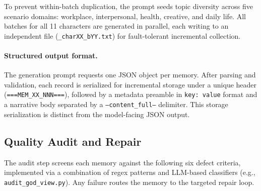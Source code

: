 \documentclass[11pt]{article}
\begin{document}
To prevent within-batch duplication, the prompt seeds topic diversity across five scenario domains: workplace, interpersonal, health, creative, and daily life. All batches for all 11 characters are generated in parallel, each writing to an independent file (\texttt{\_charXX\_bYY.txt}) for fault-tolerant incremental collection.

\paragraph{Structured output format.}
The generation prompt requests one JSON object per memory. After parsing and validation, each record is serialized for incremental storage under a unique header (\texttt{===MEM\_XX\_NNN===}), followed by a metadata preamble in \texttt{key: value} format and a narrative body separated by a \texttt{---content\_full---} delimiter. This storage serialization is distinct from the model-facing JSON output.




\subsection{Quality Audit and Repair}
\label{app:stage_d}

The audit step screens each memory against the following six defect criteria, implemented via a combination of regex patterns and LLM-based classifiers (e.g., \texttt{audit\_god\_view.py}). Any failure routes the memory to the targeted repair loop.
\end{document}
